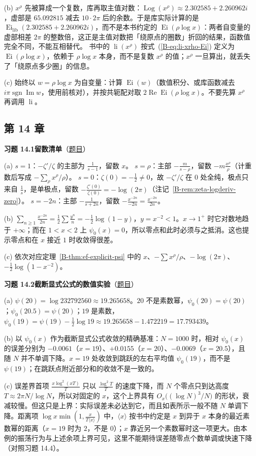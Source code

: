 \documentclass[11pt,a4paper]{article}
\DeclareMathOperator{\li}{li}
\DeclareMathOperator{\Ei}{Ei}
\renewcommand{\Re}{\operatorname{Re}}
\renewcommand{\Im}{\operatorname{Im}}
\newcommand{\bref}[1]{\ref*{B-#1}}
\newcommand{\Sol}[2]{%
  \par\addvspace{1.2em}\noindent
  \hypertarget{s:#1}{}\textbf{习题 #1\quad #2}\hfill{\small（\hyperlink{q:#1}{题目}）}\par
  \nopagebreak\smallskip}
\begin{document}
(b) $x^\rho$ 先被算成一个复数，库再取主值对数：$\operatorname{Log}(x^\rho)\approx2.302585+2.260962i$，虚部是 $65.092815$ 减去 $10\cdot2\pi$ 后的余数。于是库实际计算的是 $\Ei_{\mathrm{lib}}(2.302585+2.260962i)$，而不是本书约定的 $\Ei(\rho\log x)$：两者自变量的虚部相差 $2\pi$ 的整数倍，这正是主值对数把「绕原点的圈数」折回的结果，函数值完全不同，不能互相替代。
书中的 $\li(x^\rho)$ 按式~(\bref{eq:li-xrho-Ei}) 定义为 $\Ei(\rho\log x)$，依赖于 $\rho\log x$ 本身，而不是复数 $x^\rho$ 的值；$x^\rho$ 一旦算出，就丢失了「绕原点多少圈」的信息。

(c) 始终以 $w=\rho\log x$ 为自变量：计算 $\Ei(w)$（数值积分、或库函数减去 $i\pi\operatorname{sgn}\Im w$，使用前核对），并按共轭配对取 $2\Re\Ei(\rho\log x)$。不要先算 $x^\rho$ 再调用 $\li$。

\subsection*{第 14 章}

\Sol{14.1}{留数清单}
(a) $s=1$：$-\zeta'/\zeta$ 的主部为 $\frac1{s-1}$，留数 $x$。
$s=\rho$：主部 $-\frac m{s-\rho}$，留数 $-m\frac{x^\rho}\rho$（计重数后写成 $-\sum_\rho x^\rho/\rho$）。
$s=0$：$\zeta(0)=-\frac12\neq0$，故 $-\zeta'/\zeta$ 在 $0$ 处全纯，极点只来自 $\frac1s$，是单极点，留数 $-\frac{\zeta'(0)}{\zeta(0)}=-\log(2\pi)$（注记~\bref{rem:zeta-logderiv-zero}）。
$s=-2n$：主部 $-\frac1{s+2n}$，留数 $-\frac{x^{-2n}}{-2n}=\frac{x^{-2n}}{2n}$。

(b) $\sum_{n\ge1}\frac{x^{-2n}}{2n}=\frac12\sum\frac{y^n}n=-\frac12\log(1-y)$，$y=x^{-2}<1$。$x\to1^+$ 时它对数地趋于 $+\infty$；而在 $1<x<2$ 上 $\psi_0(x)=0$，所以零点和此时必须与之抵消。这也提示零点和在 $x$ 接近 $1$ 时收敛得很差。

(c) 依次对应定理~\bref{thm:ef-explicit-psi} 中的 $x$、$-\sum x^\rho/\rho$、$-\log(2\pi)$、$-\frac12\log(1-x^{-2})$。

\Sol{14.2}{截断显式公式的数值实验}
(a) $\psi(20)=\log232792560\approx19.265658$。$20$ 不是素数幂，$\psi_0(20)=\psi(20)$；$\psi_0(20.5)=\psi(20)$；$19$ 是素数，$\psi_0(19)=\psi(19)-\frac12\log19\approx19.265658-1.472219=17.793439$。

(b) 以 $\psi_0(x)$ 作为截断显式公式收敛的精确基准：$N=1000$ 时，相对 $\psi_0(x)$ 的误差分别为 $-0.0061$（$x=19$）、$+0.0155$（$x=20$）、$-0.0069$（$x=20.5$），且随 $N$ 并不单调下降。$x=19$ 处收敛到跳跃的左右平均值 $\psi_0(19)$，而不是 $\psi(19)$；在跳跃点附近部分和的收敛不是一致的。

(c) 误差界首项 $\frac{x\log^2(xT)}T$ 只以 $\frac{\log^2T}T$ 的速度下降，而 $N$ 个零点只到达高度 $T\approx2\pi N/\log N$，所以对固定的 $x$，这个上界具有 $O_x\bigl((\log N)^3/N\bigr)$ 的形状，衰减较慢。但这只是上界：实际误差未必达到它，而且如表所示一般不随 $N$ 单调下降。距离项 $\log x\min(1,\frac x{T\langle x\rangle})$ 中，$\langle x\rangle$ 按书中约定是 $x$ 到异于 $x$ 本身的最近素数幂的距离（$x=19$ 时为 $2$，不是 $0$）；$x$ 靠近另一个素数幂时这一项更大。由本例的振荡行为与上述余项上界可见，这里不能期待误差随零点个数单调或快速下降（对照习题 14.4）。
\end{document}
